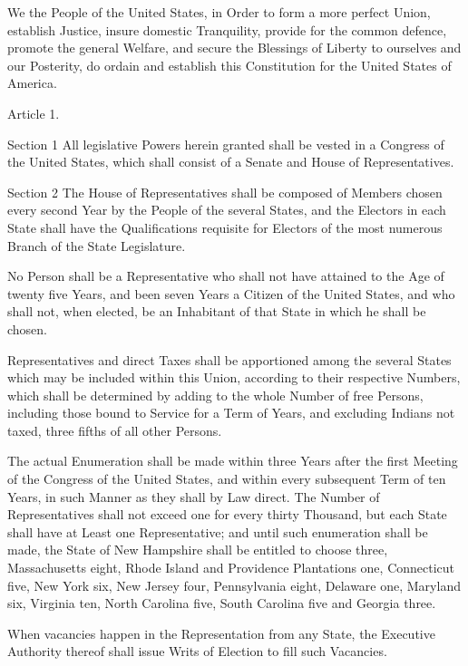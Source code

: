 \documentclass[12pt,a4paper]{article}
\begin{document}


We the People of the United States, in Order to form a more perfect Union,
establish Justice, insure domestic Tranquility, provide for the common
defence, promote the general Welfare, and secure the Blessings of Liberty to
ourselves and our Posterity, do ordain and establish this Constitution for the
United States of America.

Article 1.

Section 1
All legislative Powers herein granted shall be vested in a Congress of the
United States, which shall consist of a Senate and House of Representatives.

Section 2
The House of Representatives shall be composed of Members chosen every second
Year by the People of the several States, and the Electors in each State shall
have the Qualifications requisite for Electors of the most numerous Branch of
the State Legislature.

No Person shall be a Representative who shall not have attained to the Age of
twenty five Years, and been seven Years a Citizen of the United States, and who
shall not, when elected, be an Inhabitant of that State in which he shall be
chosen.

Representatives and direct Taxes shall be apportioned among the several States
which may be included within this Union, according to their respective Numbers,
which shall be determined by adding to the whole Number of free Persons,
including those bound to Service for a Term of Years, and excluding Indians not
taxed, three fifths of all other Persons.

The actual Enumeration shall be made within three Years after the first Meeting
of the Congress of the United States, and within every subsequent Term of ten
Years, in such Manner as they shall by Law direct. The Number of
Representatives shall not exceed one for every thirty Thousand, but each State
shall have at Least one Representative; and until such enumeration shall be
made, the State of New Hampshire shall be entitled to choose three,
Massachusetts eight, Rhode Island and Providence Plantations one, Connecticut
five, New York six, New Jersey four, Pennsylvania eight, Delaware one, Maryland
six, Virginia ten, North Carolina five, South Carolina five and Georgia three.

When vacancies happen in the Representation from any State, the Executive
Authority thereof shall issue Writs of Election to fill such Vacancies.
\end{document}
